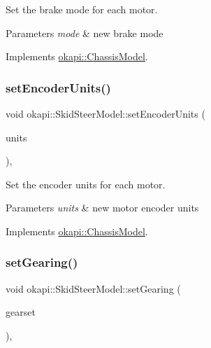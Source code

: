 Set the brake mode for each motor.


\begin{DoxyParams}{Parameters}
{\em mode} & new brake mode \\
\hline
\end{DoxyParams}


Implements \mbox{\hyperlink{classokapi_1_1ChassisModel_a20e3cde96d536e6c722aa5686e5cc8e8}{okapi\+::\+Chassis\+Model}}.

\mbox{\label{classokapi_1_1SkidSteerModel_a8922c028a9f09893061938fe50fb2a79}} 
\subsubsection{\texorpdfstring{setEncoderUnits()}{setEncoderUnits()}}
{\footnotesize\ttfamily void okapi\+::\+Skid\+Steer\+Model\+::set\+Encoder\+Units (\begin{DoxyParamCaption}\item[{\mbox{\hyperlink{classokapi_1_1AbstractMotor_ae811cd825099f2defadeb1b7f7e7764c}{Abstract\+Motor\+::encoder\+Units}}}]{units }\end{DoxyParamCaption})\hspace{0.3cm}{\ttfamily [override]}, {\ttfamily [virtual]}}

Set the encoder units for each motor.


\begin{DoxyParams}{Parameters}
{\em units} & new motor encoder units \\
\hline
\end{DoxyParams}


Implements \mbox{\hyperlink{classokapi_1_1ChassisModel_ae8ba9a72bf827af4c6feffaac99b33ee}{okapi\+::\+Chassis\+Model}}.

\mbox{\label{classokapi_1_1SkidSteerModel_ad890989e345cfd7455436bc5dd6efdcc}} 
\subsubsection{\texorpdfstring{setGearing()}{setGearing()}}
{\footnotesize\ttfamily void okapi\+::\+Skid\+Steer\+Model\+::set\+Gearing (\begin{DoxyParamCaption}\item[{\mbox{\hyperlink{classokapi_1_1AbstractMotor_a88aaa6ea2fa10f5520a537bbf26774d5}{Abstract\+Motor\+::gearset}}}]{gearset }\end{DoxyParamCaption})\hspace{0.3cm}{\ttfamily [override]}, {\ttfamily [virtual]}}

